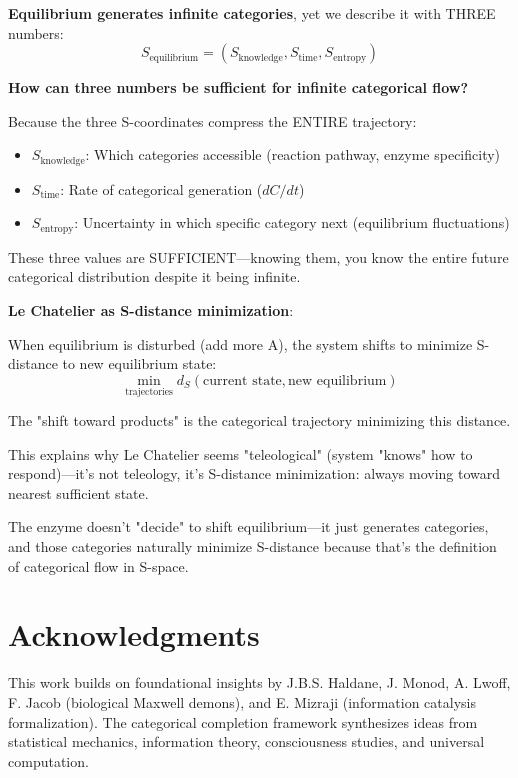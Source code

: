 \documentclass[12pt,a4paper]{article}
\begin{document}
\textbf{Equilibrium generates infinite categories}, yet we describe it with THREE numbers:
\begin{equation}
S_{\text{equilibrium}} = (S_{\text{knowledge}}, S_{\text{time}}, S_{\text{entropy}})
\end{equation}

\textbf{How can three numbers be sufficient for infinite categorical flow?}

Because the three S-coordinates compress the ENTIRE trajectory:
\begin{itemize}
\item $S_{\text{knowledge}}$: Which categories accessible (reaction pathway, enzyme specificity)
\item $S_{\text{time}}$: Rate of categorical generation ($dC/dt$)
\item $S_{\text{entropy}}$: Uncertainty in which specific category next (equilibrium fluctuations)
\end{itemize}

These three values are SUFFICIENT—knowing them, you know the entire future categorical distribution despite it being infinite.

\textbf{Le Chatelier as S-distance minimization}:

When equilibrium is disturbed (add more A), the system shifts to minimize S-distance to new equilibrium state:
\begin{equation}
\min_{\text{trajectories}} d_S(\text{current state}, \text{new equilibrium})
\end{equation}

The "shift toward products" is the categorical trajectory minimizing this distance.

This explains why Le Chatelier seems "teleological" (system "knows" how to respond)—it's not teleology, it's S-distance minimization: always moving toward nearest sufficient state.

The enzyme doesn't "decide" to shift equilibrium—it just generates categories, and those categories naturally minimize S-distance because that's the definition of categorical flow in S-space.

\section*{Acknowledgments}

This work builds on foundational insights by J.B.S. Haldane, J. Monod, A. Lwoff, F. Jacob (biological Maxwell demons), and E. Mizraji (information catalysis formalization). The categorical completion framework synthesizes ideas from statistical mechanics, information theory, consciousness studies, and universal computation.
\end{document}
